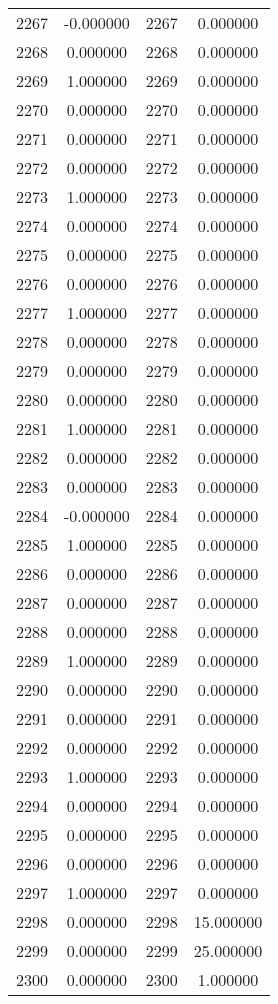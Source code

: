 \documentclass[12pt]{article}
\begin{document}
\begin{longtable}{@{}cccc@{}}
2267 & -0.000000 & 2267 & 0.000000 \\
2268 & 0.000000 & 2268 & 0.000000 \\
2269 & 1.000000 & 2269 & 0.000000 \\
2270 & 0.000000 & 2270 & 0.000000 \\
2271 & 0.000000 & 2271 & 0.000000 \\
2272 & 0.000000 & 2272 & 0.000000 \\
2273 & 1.000000 & 2273 & 0.000000 \\
2274 & 0.000000 & 2274 & 0.000000 \\
2275 & 0.000000 & 2275 & 0.000000 \\
2276 & 0.000000 & 2276 & 0.000000 \\
2277 & 1.000000 & 2277 & 0.000000 \\
2278 & 0.000000 & 2278 & 0.000000 \\
2279 & 0.000000 & 2279 & 0.000000 \\
2280 & 0.000000 & 2280 & 0.000000 \\
2281 & 1.000000 & 2281 & 0.000000 \\
2282 & 0.000000 & 2282 & 0.000000 \\
2283 & 0.000000 & 2283 & 0.000000 \\
2284 & -0.000000 & 2284 & 0.000000 \\
2285 & 1.000000 & 2285 & 0.000000 \\
2286 & 0.000000 & 2286 & 0.000000 \\
2287 & 0.000000 & 2287 & 0.000000 \\
2288 & 0.000000 & 2288 & 0.000000 \\
2289 & 1.000000 & 2289 & 0.000000 \\
2290 & 0.000000 & 2290 & 0.000000 \\
2291 & 0.000000 & 2291 & 0.000000 \\
2292 & 0.000000 & 2292 & 0.000000 \\
2293 & 1.000000 & 2293 & 0.000000 \\
2294 & 0.000000 & 2294 & 0.000000 \\
2295 & 0.000000 & 2295 & 0.000000 \\
2296 & 0.000000 & 2296 & 0.000000 \\
2297 & 1.000000 & 2297 & 0.000000 \\
2298 & 0.000000 & 2298 & 15.000000 \\
2299 & 0.000000 & 2299 & 25.000000 \\
2300 & 0.000000 & 2300 & 1.000000 \\

\end{longtable}
\end{document}
